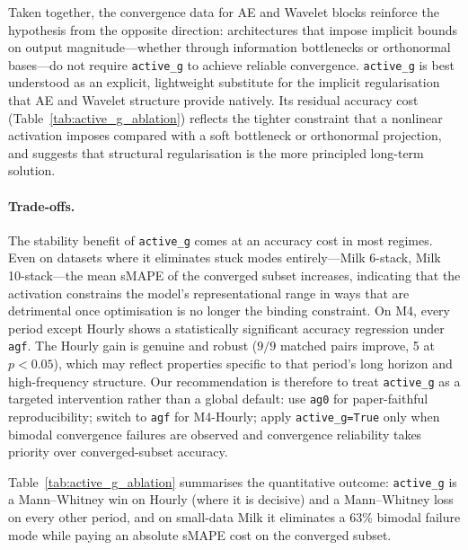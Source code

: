 \documentclass{article}
\begin{document}
Taken together, the convergence data for AE and Wavelet blocks reinforce the hypothesis from the opposite direction: architectures that impose implicit bounds on output magnitude---whether through information bottlenecks or orthonormal bases---do not require \texttt{active\_g} to achieve reliable convergence. \texttt{active\_g} is best understood as an explicit, lightweight substitute for the implicit regularisation that AE and Wavelet structure provide natively. Its residual accuracy cost (Table~\ref{tab:active_g_ablation}) reflects the tighter constraint that a nonlinear activation imposes compared with a soft bottleneck or orthonormal projection, and suggests that structural regularisation is the more principled long-term solution.

\paragraph{Trade-offs.}
The stability benefit of \texttt{active\_g} comes at an accuracy cost in most regimes. Even on datasets where it eliminates stuck modes entirely---Milk 6-stack, Milk 10-stack---the mean sMAPE of the converged subset increases, indicating that the activation constrains the model's representational range in ways that are detrimental once optimisation is no longer the binding constraint. On M4, every period except Hourly shows a statistically significant accuracy regression under \texttt{agf}. The Hourly gain is genuine and robust ($9/9$ matched pairs improve, 5 at $p < 0.05$), which may reflect properties specific to that period's long horizon and high-frequency structure. Our recommendation is therefore to treat \texttt{active\_g} as a targeted intervention rather than a global default: use \texttt{ag0} for paper-faithful reproducibility; switch to \texttt{agf} for M4-Hourly; apply \texttt{active\_g=True} only when bimodal convergence failures are observed and convergence reliability takes priority over converged-subset accuracy.

Table~\ref{tab:active_g_ablation} summarises the quantitative outcome: \texttt{active\_g} is a Mann--Whitney win on Hourly (where it is decisive) and a Mann--Whitney loss on every other period, and on small-data Milk it eliminates a 63\% bimodal failure mode while paying an absolute sMAPE cost on the converged subset.
\end{document}
